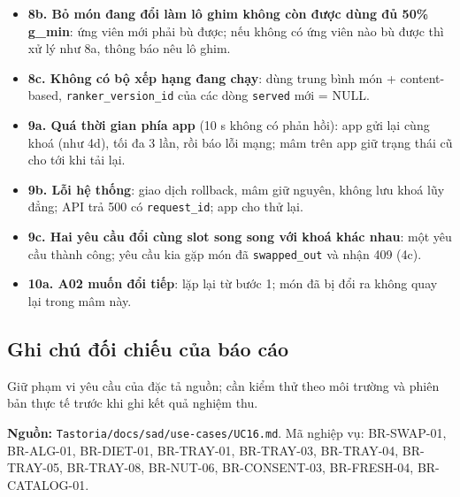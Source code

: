 \begin{itemize}
\item \textbf{8b. Bỏ món đang đổi làm lô ghim không còn được dùng đủ 50\% g\_\allowbreak{}min}: ứng viên mới phải bù được; nếu không có ứng viên nào bù được thì xử lý như 8a, thông báo nêu lô ghim.
\item \textbf{8c. Không có bộ xếp hạng đang chạy}: dùng trung bình món + content-\allowbreak{}based, {\small\texttt{ranker\_\allowbreak{}\allowbreak{}version\_\allowbreak{}\allowbreak{}id}} của các dòng {\small\texttt{served}} mới = NULL.
\item \textbf{9a. Quá thời gian phía app} (10 s không có phản hồi): app gửi lại cùng khoá (như 4d), tối đa 3 lần, rồi báo lỗi mạng; mâm trên app giữ trạng thái cũ cho tới khi tải lại.
\item \textbf{9b. Lỗi hệ thống}: giao dịch rollback, mâm giữ nguyên, không lưu khoá lũy đẳng; API trả 500 có {\small\texttt{request\_\allowbreak{}\allowbreak{}id}}; app cho thử lại.
\item \textbf{9c. Hai yêu cầu đổi cùng slot song song với khoá khác nhau}: một yêu cầu thành công; yêu cầu kia gặp món đã {\small\texttt{swapped\_\allowbreak{}\allowbreak{}out}} và nhận 409 (4c).
\item \textbf{10a. A02 muốn đổi tiếp}: lặp lại từ bước 1; món đã bị đổi ra không quay lại trong mâm này.
\end{itemize}
\subsection{Ghi chú đối chiếu của báo cáo}
Giữ phạm vi yêu cầu của đặc tả nguồn; cần kiểm thử theo môi trường và phiên bản thực tế trước khi ghi kết quả nghiệm thu.

\textbf{Nguồn:} {\small\texttt{Tastoria/\allowbreak{}\allowbreak{}docs/\allowbreak{}\allowbreak{}sad/\allowbreak{}\allowbreak{}use-\allowbreak{}cases/\allowbreak{}\allowbreak{}UC16.\allowbreak{}md}}. Mã nghiệp vụ: BR-\allowbreak{}SWAP-\allowbreak{}01, BR-\allowbreak{}ALG-\allowbreak{}01, BR-\allowbreak{}DIET-\allowbreak{}01, BR-\allowbreak{}TRAY-\allowbreak{}01, BR-\allowbreak{}TRAY-\allowbreak{}03, BR-\allowbreak{}TRAY-\allowbreak{}04, BR-\allowbreak{}TRAY-\allowbreak{}05, BR-\allowbreak{}TRAY-\allowbreak{}08, BR-\allowbreak{}NUT-\allowbreak{}06, BR-\allowbreak{}CONSENT-\allowbreak{}03, BR-\allowbreak{}FRESH-\allowbreak{}04, BR-\allowbreak{}CATALOG-\allowbreak{}01.

